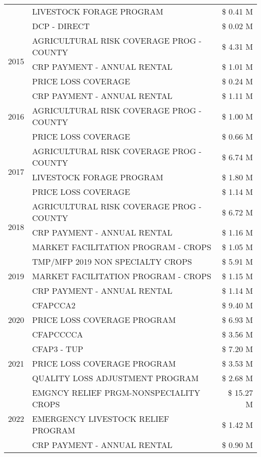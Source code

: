 \begin{tabular}{llr}
 & LIVESTOCK FORAGE PROGRAM & \$ 0.41 M \\
 & DCP - DIRECT & \$ 0.02 M \\
\cline{1-3}
\multirow[t]{3}{*}{2015} & AGRICULTURAL RISK COVERAGE PROG - COUNTY & \$ 4.31 M \\
 & CRP PAYMENT - ANNUAL RENTAL & \$ 1.01 M \\
 & PRICE LOSS COVERAGE & \$ 0.24 M \\
\cline{1-3}
\multirow[t]{3}{*}{2016} & CRP PAYMENT - ANNUAL RENTAL & \$ 1.11 M \\
 & AGRICULTURAL RISK COVERAGE PROG - COUNTY & \$ 1.00 M \\
 & PRICE LOSS COVERAGE & \$ 0.66 M \\
\cline{1-3}
\multirow[t]{3}{*}{2017} & AGRICULTURAL RISK COVERAGE PROG - COUNTY & \$ 6.74 M \\
 & LIVESTOCK FORAGE PROGRAM & \$ 1.80 M \\
 & PRICE LOSS COVERAGE & \$ 1.14 M \\
\cline{1-3}
\multirow[t]{3}{*}{2018} & AGRICULTURAL RISK COVERAGE PROG - COUNTY & \$ 6.72 M \\
 & CRP PAYMENT - ANNUAL RENTAL & \$ 1.16 M \\
 & MARKET FACILITATION PROGRAM - CROPS & \$ 1.05 M \\
\cline{1-3}
\multirow[t]{3}{*}{2019} & TMP/MFP 2019 NON SPECIALTY CROPS & \$ 5.91 M \\
 & MARKET FACILITATION PROGRAM - CROPS & \$ 1.15 M \\
 & CRP PAYMENT - ANNUAL RENTAL & \$ 1.14 M \\
\cline{1-3}
\multirow[t]{3}{*}{2020} & CFAPCCA2 & \$ 9.40 M \\
 & PRICE LOSS COVERAGE PROGRAM & \$ 6.93 M \\
 & CFAPCCCCA & \$ 3.56 M \\
\cline{1-3}
\multirow[t]{3}{*}{2021} & CFAP3 - TUP & \$ 7.20 M \\
 & PRICE LOSS COVERAGE PROGRAM & \$ 3.53 M \\
 & QUALITY LOSS ADJUSTMENT PROGRAM & \$ 2.68 M \\
\cline{1-3}
\multirow[t]{3}{*}{2022} & EMGNCY RELIEF PRGM-NONSPECIALITY CROPS & \$ 15.27 M \\
 & EMERGENCY LIVESTOCK RELIEF PROGRAM & \$ 1.42 M \\
 & CRP PAYMENT - ANNUAL RENTAL & \$ 0.90 M \\
\cline{1-3}
\bottomrule
\end{tabular}
